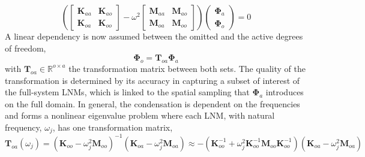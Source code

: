 \documentclass[11pt]{article}
\begin{document}
\begin{equation}
\left( \begin{bmatrix}
\bm{K}_{aa} & \bm{K}_{ao} \\ \bm{K}_{oa} & \bm{K}_{oo}
\end{bmatrix} - \omega^2\begin{bmatrix}
\bm{M}_{aa} & \bm{M}_{ao} \\ \bm{M}_{oa} & \bm{M}_{oo}
\end{bmatrix}
\right)
\begin{pmatrix}
\bm{\Phi}_a \\ \bm{\Phi}_o
\end{pmatrix} = 0
\end{equation}
A linear dependency is now assumed between the omitted and the active degrees of freedom, 
\begin{equation}\label{eq2:Toa}
\pmb{\Phi}_o =  \pmb{T}_{oa} \pmb{\Phi}_a
\end{equation}
with $\pmb{T}_{oa} \in \mathbb{R}^{o\times a}$ the transformation matrix between both sets.
The quality of the transformation is determined by its accuracy in capturing a subset of interest of the full-system LNMs, which is linked to the spatial sampling that $\pmb{\Phi}_a$ introduces on the full domain.
In general, the condensation is dependent on the frequencies and forms a nonlinear eigenvalue problem where each LNM,  with natural frequency, $\omega_j$, has one transformation matrix,
\begin{equation}\label{eq2:transformation_exact}
\pmb{T}_{oa}(\omega_j) = (\pmb{K}_{oo}-\omega^2_j \pmb{M}_{oo})^{-1}( \pmb{K}_{oa}- \omega_j^2 \pmb{M}_{oa}) \approx -(\pmb{K}_{oo}^{-1}+\omega^2_j\pmb{K}_{oo}^{-1}\pmb{M}_{oo}\pmb{K}_{oo}^{-1})(\pmb{K}_{oa}-\omega^2_j\pmb{M}_{oa})
\end{equation}
\end{document}
